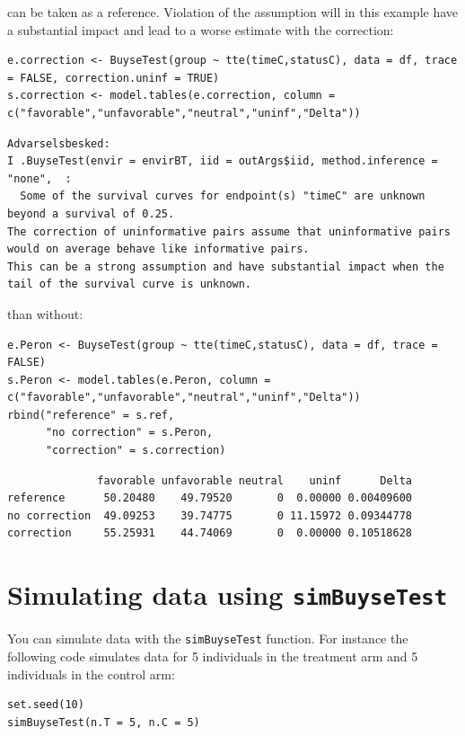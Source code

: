 \documentclass[12pt]{article}
\begin{document}
can be taken as a reference. Violation of the assumption will in this
example have a substantial impact and lead to a worse estimate with
the correction:
\lstset{language=r,label= ,caption= ,captionpos=b,numbers=none}
\begin{lstlisting}
e.correction <- BuyseTest(group ~ tte(timeC,statusC), data = df, trace = FALSE, correction.uninf = TRUE)
s.correction <- model.tables(e.correction, column = c("favorable","unfavorable","neutral","uninf","Delta"))
\end{lstlisting}

\begin{verbatim}
Advarselsbesked:
I .BuyseTest(envir = envirBT, iid = outArgs$iid, method.inference = "none",  :
  Some of the survival curves for endpoint(s) "timeC" are unknown beyond a survival of 0.25.
The correction of uninformative pairs assume that uninformative pairs would on average behave like informative pairs. 
This can be a strong assumption and have substantial impact when the tail of the survival curve is unknown.
\end{verbatim}


than without:
\lstset{language=r,label= ,caption= ,captionpos=b,numbers=none}
\begin{lstlisting}
e.Peron <- BuyseTest(group ~ tte(timeC,statusC), data = df, trace = FALSE)
s.Peron <- model.tables(e.Peron, column = c("favorable","unfavorable","neutral","uninf","Delta"))
rbind("reference" = s.ref,
      "no correction" = s.Peron,
      "correction" = s.correction)
\end{lstlisting}
\begin{verbatim}
              favorable unfavorable neutral    uninf      Delta
reference      50.20480    49.79520       0  0.00000 0.00409600
no correction  49.09253    39.74775       0 11.15972 0.09344778
correction     55.25931    44.74069       0  0.00000 0.10518628
\end{verbatim}


\clearpage

\section{Simulating data using \texttt{simBuyseTest}}
\label{sec:orgee99471}
You can simulate data with the \texttt{simBuyseTest} function. For instance
the following code simulates data for 5 individuals in the treatment
arm and 5 individuals in the control arm:
\lstset{language=r,label= ,caption= ,captionpos=b,numbers=none}
\begin{lstlisting}
set.seed(10)
simBuyseTest(n.T = 5, n.C = 5)
\end{lstlisting}
\end{document}

